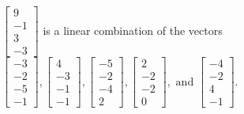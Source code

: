 \begin{exercise}
\begin{exerciseStatement}
  \end{exerciseStatement}
  \begin{exerciseAnswer}
   \(\left[\begin{array}{c}
9 \\
-1 \\
3 \\
-3
\end{array}\right]\) 
  	 is  
	a linear combination of the vectors \(\left[\begin{array}{c}
-3 \\
-2 \\
-5 \\
-1
\end{array}\right] , \left[\begin{array}{c}
4 \\
-3 \\
-1 \\
-1
\end{array}\right] , \left[\begin{array}{c}
-5 \\
-2 \\
-4 \\
2
\end{array}\right] , \left[\begin{array}{c}
2 \\
-2 \\
-2 \\
0
\end{array}\right] , \text{ and } \left[\begin{array}{c}
-4 \\
-2 \\
4 \\
-1
\end{array}\right]\).

	
  


  \end{exerciseAnswer}
\end{exercise}
